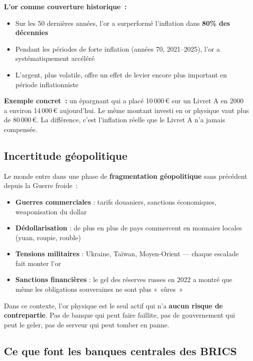 \documentclass[14pt,a4paper]{extarticle}
\begin{document}
\textbf{L'or comme couverture historique~:}
\begin{itemize}
  \item Sur les 50 dernières années, l'or a surperformé l'inflation dans \textbf{80\% des décennies}
  \item Pendant les périodes de forte inflation (années 70, 2021--2025), l'or a systématiquement accéléré
  \item L'argent, plus volatile, offre un effet de levier encore plus important en période inflationniste
\end{itemize}

\textbf{Exemple concret~:} un épargnant qui a placé 10\,000\,€ sur un Livret A en 2000 a environ 14\,000\,€ aujourd'hui. Le même montant investi en or physique vaut plus de 80\,000\,€. La différence, c'est l'inflation réelle que le Livret A n'a jamais compensée.

\subsection{Incertitude géopolitique}

Le monde entre dans une phase de \textbf{fragmentation géopolitique} sans précédent depuis la Guerre froide~:

\begin{itemize}
  \item \textbf{Guerres commerciales} : tarifs douaniers, sanctions économiques, weaponisation du dollar
  \item \textbf{Dédollarisation} : de plus en plus de pays commercent en monnaies locales (yuan, roupie, rouble)
  \item \textbf{Tensions militaires} : Ukraine, Taïwan, Moyen-Orient --- chaque escalade fait monter l'or
  \item \textbf{Sanctions financières} : le gel des réserves russes en 2022 a montré que même les obligations souveraines ne sont plus «~sûres~»
\end{itemize}

Dans ce contexte, l'or physique est le seul actif qui n'a \textbf{aucun risque de contrepartie}. Pas de banque qui peut faire faillite, pas de gouvernement qui peut le geler, pas de serveur qui peut tomber en panne.

\subsection{Ce que font les banques centrales des BRICS}
\end{document}
